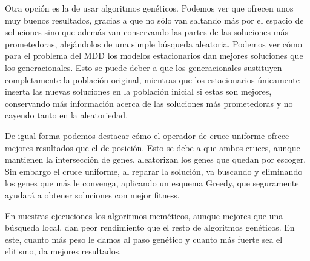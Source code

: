 Otra opción es la de usar algoritmos genéticos. Podemos ver que ofrecen unos muy buenos resultados, gracias a que no sólo van saltando más por el espacio de soluciones
sino que además van conservando las partes de las soluciones más prometedoras, alejándolos de una simple búsqueda aleatoria. Podemos ver cómo para el problema del MDD los modelos
estacionarios dan mejores soluciones que los generacionales. Esto se puede deber a que los generacionales sustituyen completamente la población original, mientras que los estacionarios
únicamente inserta las nuevas soluciones en la población inicial si estas son mejores, conservando más información acerca de las soluciones más prometedoras y no cayendo tanto en la aleatoriedad.

De igual forma podemos destacar cómo el operador de cruce uniforme ofrece mejores resultados que el de posición. Esto se debe a que ambos cruces, aunque mantienen la intersección de genes,
aleatorizan los genes que quedan por escoger. Sin embargo el cruce uniforme, al reparar la solución, va buscando y eliminando los genes que más le convenga, aplicando un esquema Greedy, que
seguramente ayudará a obtener soluciones con mejor fitness.

En nuestras ejecuciones los algoritmos meméticos, aunque mejores que una búsqueda local, dan peor rendimiento que el resto de algoritmos genéticos.
En este, cuanto más peso le damos al paso genético y cuanto más fuerte sea el elitismo, da mejores resultados.














